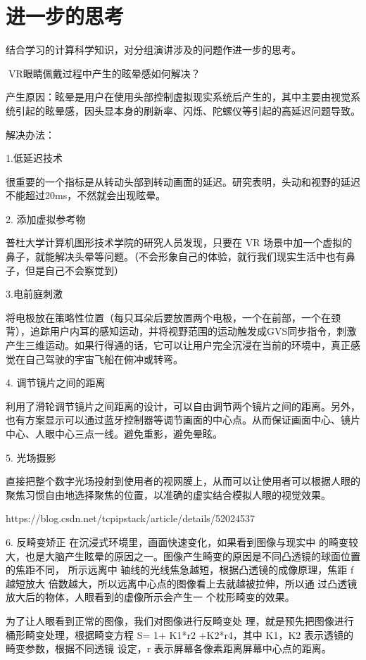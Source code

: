 \documentclass{article}
\begin{document}
\section{进一步的思考}
结合学习的计算科学知识，对分组演讲涉及的问题作进一步的思考。\par
VR眼睛佩戴过程中产生的眩晕感如何解决？\par
产生原因：眩晕是用户在使用头部控制虚拟现实系统后产生的，其中主要由视觉系统引起的眩晕感，因头显本身的刷新率、闪烁、陀螺仪等引起的高延迟问题导致。\par
解决办法：\par
1.低延迟技术\par
很重要的一个指标是从转动头部到转动画面的延迟。研究表明，头动和视野的延迟不能超过20ms，不然就会出现眩晕。\par
2. 添加虚拟参考物\par
普杜大学计算机图形技术学院的研究人员发现，只要在 VR 场景中加一个虚拟的鼻子，就能解决头晕等问题。（不会形象自己的体验，就行我们现实生活中也有鼻子，但是自己不会察觉到）\par
3.电前庭刺激\par
将电极放在策略性位置（每只耳朵后要放置两个电极，一个在前部，一个在颈背），追踪用户内耳的感知运动，并将视野范围的运动触发成GVS同步指令，刺激产生三维运动。如果行得通的话，它可以让用户完全沉浸在当前的环境中，真正感觉在自己驾驶的宇宙飞船在俯冲或转弯。\par
4. 调节镜片之间的距离\par
利用了滑轮调节镜片之间距离的设计，可以自由调节两个镜片之间的距离。另外，也有方案显示可以通过蓝牙控制器等调节画面的中心点。从而保证画面中心、镜片中心、人眼中心三点一线。避免重影，避免晕眩。\par
5. 光场摄影\par
直接把整个数字光场投射到使用者的视网膜上，从而可以让使用者可以根据人眼的聚焦习惯自由地选择聚焦的位置，以准确的虚实结合模拟人眼的视觉效果。\par
https://blog.csdn.net/tcpipstack/article/details/52024537\par
6. 反畸变矫正 
在沉浸式环境里，画面快速变化，如果看到图像与现实中 的畸变较大，也是大脑产生眩晕的原因之一。图像产生畸变的原因是不同凸透镜的球面位置的焦距不同， 所示远离中 轴线的光线焦急越短，根据凸透镜的成像原理，焦距 f 越短放大 倍数越大，所以远离中心点的图像看上去就越被拉伸，所以通 过凸透镜放大后的物体，人眼看到的虚像所示会产生一 个枕形畸变的效果。\par
为了让人眼看到正常的图像，我们对图像进行反畸变处 理，就是预先把图像进行桶形畸变处理，根据畸变方程 S= 1+ K1*r2 +K2*r4，其中 K1，K2 表示透镜的畸变参数，根据不同透镜 设定，r 表示屏幕各像素距离屏幕中心点的距离。\par
\end{document}
